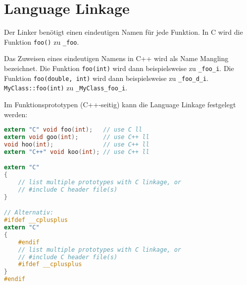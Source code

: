 \section{Language Linkage}
Der Linker benötigt einen eindeutigen Namen für jede Funktion.
In C wird die Funktion \lstinline[style=cppstyle]{foo()} zu \lstinline[style=cppstyle]{_foo}.

Das Zuweisen eines eindeutigen Namens in C++ wird als Name Mangling bezeichnet.
Die Funktion \lstinline[style=cppstyle]{foo(int)} wird dann beispielsweise zu \lstinline[style=cppstyle]{_foo_i}. Die Funktion \lstinline[style=cppstyle]{foo(double, int)} wird dann beispielsweise zu \lstinline[style=cppstyle]{_foo_d_i}. \lstinline[style=cppstyle]{MyClass::foo(int)} zu \lstinline[style=cppstyle]{_MyClass_foo_i}.

Im Funktionsprototypen (C++‐seitig) kann die Language Linkage festgelegt werden:
\begin{lstlisting}[language=c, style=cppstyle]
extern "C" void foo(int);	// use C ll
extern void goo(int);		// use C++ ll
void hoo(int);				// use C++ ll
extern "C++" void koo(int);	// use C++ ll

extern "C"
{
	// list multiple prototypes with C linkage, or
	// #include C header file(s)
}

// Alternativ:
#ifdef __cplusplus
extern "C"
{
	#endif
	// list multiple prototypes with C linkage, or
	// #include C header file(s)
	#ifdef __cplusplus
}
#endif
\end{lstlisting}